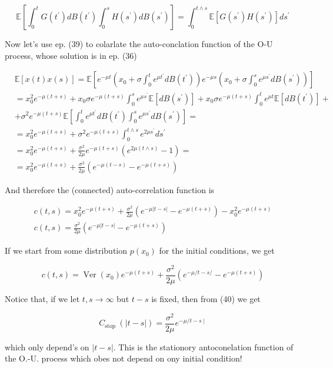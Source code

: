 \begin{equation*}
\mathbb{E}\left[
\int_{0}^{t} G
\left(t^{\prime}\right) d B
\left(t^{\prime}\right) \int_{0}^{s} H
\left(s^{\prime}\right) d B
\left(s^{\prime}\right)\right]=\int_{0}^{t \wedge s} \mathbb{E}\left[G
\left(s^{\prime}\right) H
\left(s^{\prime}\right)\right] d s^{\prime} \tag{39}
\end{equation*}


Now let's use ep. (39) to colarlate the auto-conclation function of the O-U process, whose solution is in ep. (36)

$$
 \begin{aligned}
& \mathbb{E}[x(t) x(s)]=\mathbb{E}\left[e^{-\mu t}\left(x_{0}+\sigma \int_{0}^{t} e^{\mu t^{\prime}} d B
\left(t^{\prime}\right)\right) e^{-\mu s}\left(x_{0}+\sigma \int_{0}^{s} e^{\mu s^{\prime}} d B
\left(s^{\prime}\right)\right)\right] \\
& =x_{0}^{2} e^{-\mu(t+s)}+x_{0} \sigma e^{-\mu(t+s)} \int_{0}^{s} e^{\mu s^{\prime}} \mathbb{E}\left[d B
\left(s^{\prime}\right)\right]+x_{0} \sigma e^{-\mu(t+s)} \int_{0}^{t} e^{\mu t} \mathbb{E}\left[d B
\left(t^{\prime}\right)\right]+
 \\
& +\sigma^{2} e^{-\mu(t+s)} \mathbb{E}\left[
\int_{0}^{t} e^{\mu t^{\prime}} d B
\left(t^{\prime}\right) \int_{0}^{s} e^{\mu s^{\prime}} d B
\left(s^{\prime}\right)\right]=
 \\
& =x_{0}^{2} e^{-\mu(t+s)}+\sigma^{2} e^{-\mu(t+s)} \int_{0}^{t \wedge s} e^{2 \mu s^{\prime}} d s^{\prime} \\
& =x_{0}^{2} e^{-\mu(t+s)}+\frac{\sigma^{2}}{2 \mu} e^{-\mu(t+s)}\left(e^{2 \mu(t \wedge s)}-1\right)=
 \\
& =x_{0}^{2} e^{-\mu(t+s)}+\frac{\sigma^{2}}{2 \mu}\left(e^{-\mu(t-s)}-e^{-\mu(t+s)}\right)
\end{aligned}
$$ 

And therefore the (connected) auto-correlation function is


\begin{gather*}
c(t, s)=x_{0}^{2} e^{-\mu(t+s)}+\frac{\sigma^{2}}{2 \mu}\left(e^{-\mu|t-s|}-e^{-\mu(t+s)}\right)-x_{0}^{2} e^{-\mu(t+s)} \\
c(t, s)=\frac{\sigma^{2}}{2 \mu}\left(e^{-\mu|t-s|}-e^{-\mu(t+s)}\right) \tag{40}
\end{gather*}


If we start from some distribution $p
\left(x_{0}\right)$ for the initial conditions, we get

$$ 
c(t, s)=\operatorname{Ver}
\left(x_{0}\right) e^{-\mu(t+s)}+\frac{\sigma^{2}}{2 \mu}\left(e^{-\mu / t-s /}-e^{-\mu(t+s)}\right)
$$ 

Notice that, if we let $t, s \rightarrow \infty$ but $t-s$ is fixed, then from (40) we get


\begin{equation*}
C_{\text {stop }}(|t-s|)=\frac{\sigma^{2}}{2 \mu} e^{-\mu / t-s \mid} \tag{41}
\end{equation*}

which only depend's on $|t-s|$. This is the stationory antoconelation function of the O.-U. process which obes not depend on ony initial condition!